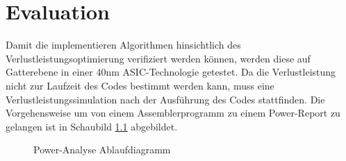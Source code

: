 \chapter{Evaluation}
\label{chap:evaluation} 
Damit die implementieren Algorithmen hinsichtlich des Verlustleistungsoptimierung verifiziert werden können, werden diese auf Gatterebene in einer 40nm ASIC-Technologie getestet. Da die Verlustleistung nicht zur Laufzeit des Codes bestimmt werden kann, muss eine Verlustleistungssimulation nach der Ausführung des Codes stattfinden. Die Vorgehensweise um von einem Assemblerprogramm zu einem Power-Report zu gelangen ist in Schaubild \ref{fig:flow_power_analyse} abgebildet.

\begin{scriptsize}
	\begin{figure}[htbp] 
		\centering
		
		\caption{Power-Analyse Ablaufdiagramm}
		\label{fig:flow_power_analyse}
	\end{figure}
\end{scriptsize}

